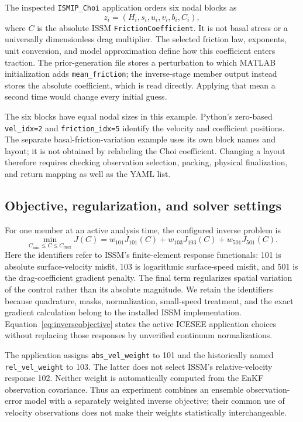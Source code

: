 \documentclass[11pt,a4paper]{article}
\newcommand{\code}[1]{\nolinkurl{#1}}
\begin{document}
The inspected \code{ISMIP_Choi} application orders six nodal blocks as
\begin{equation}
 z_i=(H_i,s_i,u_i,v_i,b_i,C_i),
 \label{eq:choistate}
\end{equation}
where \(C\) is the absolute ISSM \code{FrictionCoefficient}. It is not basal stress or a universally dimensionless drag multiplier. The selected friction law, exponents, unit conversion, and model approximation define how this coefficient enters traction. The prior-generation file stores a perturbation to which MATLAB initialization adds \code{mean_friction}; the inverse-stage member output instead stores the absolute coefficient, which is read directly. Applying that mean a second time would change every initial guess.

The six blocks have equal nodal sizes in this example. Python's zero-based \code{vel_idx=2} and \code{friction_idx=5} identify the velocity and coefficient positions. The separate basal-friction-variation example uses its own block names and layout; it is not obtained by relabeling the Choi coefficient. Changing a layout therefore requires checking observation selection, packing, physical finalization, and return mapping as well as the YAML list.

\subsection{Objective, regularization, and solver settings}
For one member at an active analysis time, the configured inverse problem is
\begin{equation}
 \min_{C_{\min}\leq C\leq C_{\max}}
 J(C)=w_{101}J_{101}(C)+w_{103}J_{103}(C)+w_{501}J_{501}(C).
 \label{eq:inverseobjective}
\end{equation}
Here the identifiers refer to ISSM's finite-element response functionals: 101 is absolute surface-velocity misfit, 103 is logarithmic surface-speed misfit, and 501 is the drag-coefficient gradient penalty. The final term regularizes spatial variation of the control rather than its absolute magnitude. We retain the identifiers because quadrature, masks, normalization, small-speed treatment, and the exact gradient calculation belong to the installed ISSM implementation. Equation~\ref{eq:inverseobjective} states the active ICESEE application choices without replacing those responses by unverified continuum normalizations.

The application assigns \code{abs_vel_weight} to 101 and the historically named \code{rel_vel_weight} to 103. The latter does not select ISSM's relative-velocity response 102. Neither weight is automatically computed from the EnKF observation covariance. Thus an experiment combines an ensemble observation-error model with a separately weighted inverse objective; their common use of velocity observations does not make their weights statistically interchangeable.
\end{document}
